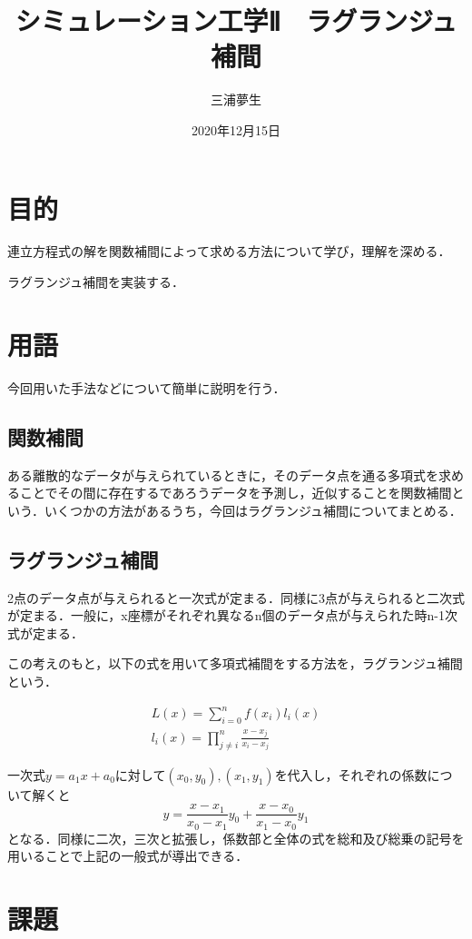 \documentclass[a4paper, titlepage]{jsarticle}
\title{シミュレーション工学Ⅱ　ラグランジュ補間}
\author{三浦夢生}
\date{2020年12月15日}
\begin{document}
	\maketitle

	\section{目的}
	連立方程式の解を関数補間によって求める方法について学び，理解を深める．

	ラグランジュ補間を実装する．
	
	\section{用語}
	今回用いた手法などについて簡単に説明を行う．

	\subsection{関数補間}
	ある離散的なデータが与えられているときに，そのデータ点を通る多項式を求めることでその間に存在するであろうデータを予測し，近似することを関数補間という．いくつかの方法があるうち，今回はラグランジュ補間についてまとめる．

	\subsection{ラグランジュ補間}
	2点のデータ点が与えられると一次式が定まる．同様に3点が与えられると二次式が定まる．一般に，x座標がそれぞれ異なるn個のデータ点が与えられた時n-1次式が定まる．

	この考えのもと，以下の式を用いて多項式補間をする方法を，ラグランジュ補間という．

	\begin{align}
		L(x)={\sum_{i=0}^{n}}f(x_i)l_i(x) \\
		l_i(x)={\prod_{j{\neq}i}^{n}}{\frac{x-{x_j}}{{x_i}-{x_j}}}
	\end{align}

	一次式$y={a_1}x+{a_0}$に対して$(x_0, y_0),(x_1, y_1)$を代入し，それぞれの係数について解くと
	\begin{equation}
		y={\frac{x-{x_1}}{{x_0}-{x_1}}}y_0+{\frac{x-{x_0}}{{x_1}-{x_0}}}y_1
	\end{equation}
	となる．同様に二次，三次と拡張し，係数部と全体の式を総和及び総乗の記号を用いることで上記の一般式が導出できる．

	\section{課題}
\end{document}
